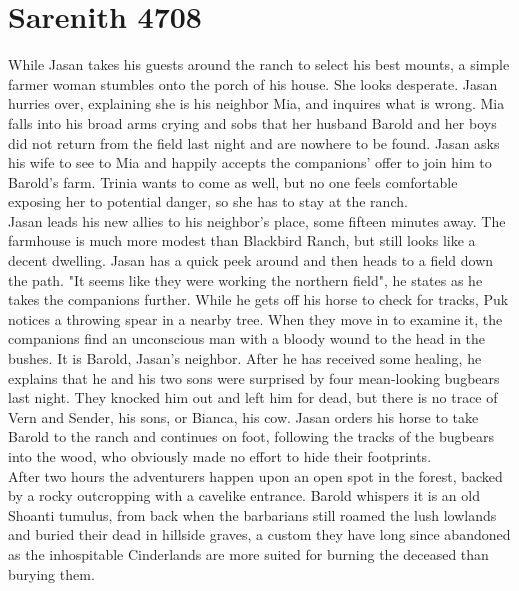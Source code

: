 \section{Sarenith 4708}

While Jasan takes his guests around the ranch to select his best mounts, a simple farmer woman stumbles onto the porch of his house. She looks desperate. Jasan hurries over, explaining she is his neighbor Mia, and inquires what is wrong. Mia falls into his broad arms crying and sobs that her husband Barold and her boys did not return from the field last night and are nowhere to be found. Jasan asks his wife to see to Mia and happily accepts the companions' offer to join him to Barold's farm. Trinia wants to come as well, but no one feels comfortable exposing her to potential danger, so she has to stay at the ranch.\\

Jasan leads his new allies to his neighbor's place, some fifteen minutes away. The farmhouse is much more modest than Blackbird Ranch, but still looks like a decent dwelling. Jasan has a quick peek around and then heads to a field down the path. "It seems like they were working the northern field", he states as he takes the companions further. While he gets off his horse to check for tracks, Puk notices a throwing spear in a nearby tree. When they move in to examine it, the companions find an unconscious man with a bloody wound to the head in the bushes. It is Barold, Jasan's neighbor. After he has received some healing, he explains that he and his two sons were surprised by four mean-looking bugbears last night. They knocked him out and left him for dead, but there is no trace of Vern and Sender, his sons, or Bianca, his cow. Jasan orders his horse to take Barold to the ranch and continues on foot, following the tracks of the bugbears into the wood, who obviously made no effort to hide their footprints.\\

After two hours the adventurers happen upon an open spot in the forest, backed by a rocky outcropping with a cavelike entrance. Barold whispers it is an old Shoanti tumulus, from back when the barbarians still roamed the lush lowlands and buried their dead in hillside graves, a custom they have long since abandoned as the inhospitable Cinderlands are more suited for burning the deceased than burying them.\\

